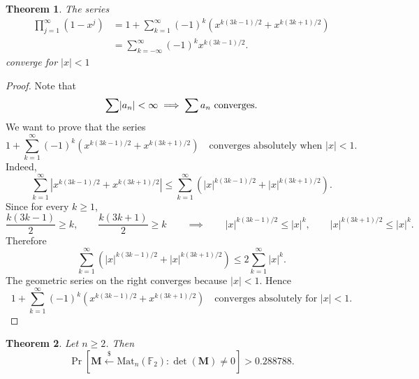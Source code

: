 \documentclass{article}
\newtheorem{theorem}{Theorem}
\theoremstyle{definition}
\newtheorem{remark}{Remark}
\newcommand{\F}{\mathbb{F}}
\renewcommand{\emph}[1]{\textbf{#1}}
\begin{document}
\begin{tcolorbox}[colback=white, colframe=axiomcolor,title={\textbf{Pentagonal Number Theorem}}]
\begin{theorem}
The series \begin{align*}
\prod_{j=1}^\infty(1-x^j)
&=1+\sum_{k=1}^{\infty}(-1)^k
\left(x^{k(3k-1)/2}+x^{k(3k+1)/2}\right)\\
&=\sum_{k=-\infty}^{\infty}(-1)^k x^{k(3k-1)/2}.
\end{align*} converge for \(|x|<1\)
\end{theorem}
\end{tcolorbox}
\begin{proof}
Note that \[
\sum\abs{a_n}<\infty\implies\sum a_n\text{ converges.}
\] We want to prove that the series \[
1+\sum_{k=1}^{\infty}(-1)^k
\left(x^{k(3k-1)/2}+x^{k(3k+1)/2}\right)\quad\text{converges absolutely when $|x|<1$. }
\]
Indeed,
\[
\sum_{k=1}^{\infty}
\left|x^{k(3k-1)/2}+x^{k(3k+1)/2}\right|
\le
\sum_{k=1}^{\infty}
\left(|x|^{k(3k-1)/2}+|x|^{k(3k+1)/2}\right).
\]
Since for every \(k\ge 1\), \[
\frac{k(3k-1)}2\ge k,
\qquad
\frac{k(3k+1)}2\ge k\qquad\implies\qquad
|x|^{k(3k-1)/2}\le |x|^k,
\qquad
|x|^{k(3k+1)/2}\le |x|^k.
\]
Therefore
\[
\sum_{k=1}^{\infty}
\left(|x|^{k(3k-1)/2}+|x|^{k(3k+1)/2}\right)
\le
2\sum_{k=1}^{\infty}|x|^k.
\]
The geometric series on the right converges because \(|x|<1\). Hence
\[
1+\sum_{k=1}^{\infty}(-1)^k
\left(x^{k(3k-1)/2}+x^{k(3k+1)/2}\right)\quad\text{
	converges absolutely for $|x|<1$.}
\]
\end{proof}


\begin{tcolorbox}[colback=white, colframe=axiomcolor,title={\textbf{Pentagonal Number Theorem}}]
\begin{theorem}
Let $n\geq 2$. Then \[
\Pr[\textbf{M}\xleftarrow{\$}\mathrm{Mat}_{n}(\F_2):\det(\textbf{M})\neq 0] > 0.288788.
\]
\end{theorem}
\end{tcolorbox}
\end{document}
